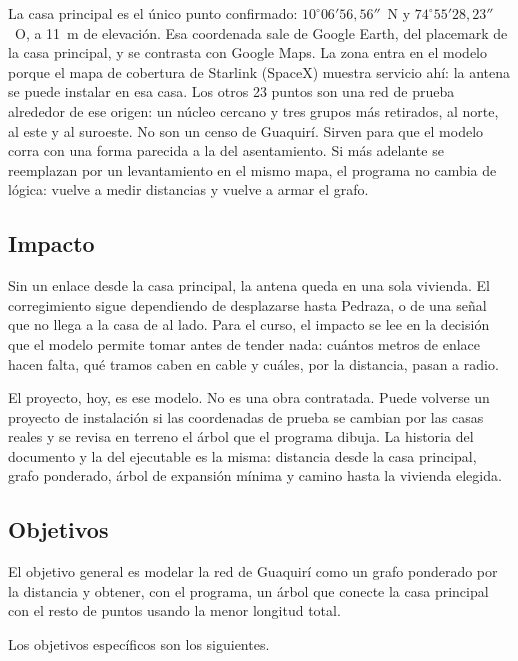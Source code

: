 \documentclass[12pt,a4paper]{article}
\begin{document}
La casa principal es el único punto confirmado: \(10^{\circ}06'56{,}56''\)~N y \(74^{\circ}55'28{,}23''\)~O, a 11~m de elevación. Esa coordenada sale de Google Earth, del placemark de la casa principal, y se contrasta con Google Maps. La zona entra en el modelo porque el mapa de cobertura de Starlink (SpaceX) muestra servicio ahí: la antena se puede instalar en esa casa. Los otros 23 puntos son una red de prueba alrededor de ese origen: un núcleo cercano y tres grupos más retirados, al norte, al este y al suroeste. No son un censo de Guaquirí. Sirven para que el modelo corra con una forma parecida a la del asentamiento. Si más adelante se reemplazan por un levantamiento en el mismo mapa, el programa no cambia de lógica: vuelve a medir distancias y vuelve a armar el grafo.

\subsection{Impacto}

Sin un enlace desde la casa principal, la antena queda en una sola vivienda. El corregimiento sigue dependiendo de desplazarse hasta Pedraza, o de una señal que no llega a la casa de al lado. Para el curso, el impacto se lee en la decisión que el modelo permite tomar antes de tender nada: cuántos metros de enlace hacen falta, qué tramos caben en cable y cuáles, por la distancia, pasan a radio.

El proyecto, hoy, es ese modelo. No es una obra contratada. Puede volverse un proyecto de instalación si las coordenadas de prueba se cambian por las casas reales y se revisa en terreno el árbol que el programa dibuja. La historia del documento y la del ejecutable es la misma: distancia desde la casa principal, grafo ponderado, árbol de expansión mínima y camino hasta la vivienda elegida.

\subsection{Objetivos}

El objetivo general es modelar la red de Guaquirí como un grafo ponderado por la distancia y obtener, con el programa, un árbol que conecte la casa principal con el resto de puntos usando la menor longitud total.

Los objetivos específicos son los siguientes.
\end{document}
